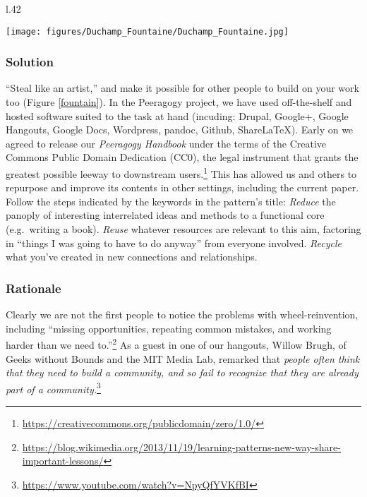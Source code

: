 \begin{wrapfigure}{l}{.42\textwidth}
\vspace{-.6cm}
\begin{center}
\texttt{[image: figures/Duchamp\_Fountaine/Duchamp\_Fountaine.jpg]}
\end{center}
\caption{A paradigmatic example of found-art. Caption reads: ``Fountain by R. Mutt, Photograph by Alfred Stieglitz, THE EXHIBIT REFUSED BY THE INDEPENDENTS''. Public domain, via the Wikimedia Commons.\label{fountain}}
\end{wrapfigure}


\subsubsection*{Solution} ``Steal like an artist,'' and make it possible for other people to build on your work too (Figure \ref{fountain}).  In the Peeragogy project, we have used off-the-shelf and hosted software suited to the task at hand (incuding: Drupal, Google+, Google Hangouts, Google Docs, Wordpress, pandoc, Github, ShareLaTeX).  Early on we agreed to release our \emph{Peeragogy Handbook} under the terms of the Creative Commons Public Domain Dedication (CC0), the legal instrument that grants the greatest possible leeway to downstream users.\footnote{\url{https://creativecommons.org/publicdomain/zero/1.0/}}  This has allowed us and others to repurpose and improve its contents in other settings, including the current paper.  Follow the steps indicated by the keywords in the pattern's title:  \emph{Reduce} the panoply of interesting interrelated ideas and methods to a functional core (e.g.~writing a book).  \emph{Reuse} whatever resources are relevant to this aim, factoring in ``things I was going to have to do anyway'' from everyone involved.  \emph{Recycle} what you've created in new connections and relationships.

\subsubsection*{Rationale} 
Clearly we are not the first people to notice the problems with wheel-reinvention, including ``missing opportunities, repeating common mistakes, and working harder than we need to.''\footnote{\url{https://blog.wikimedia.org/2013/11/19/learning-patterns-new-way-share-important-lessons/}}  As a guest in  one of our hangouts, Willow Brugh, of Geeks without Bounds and the MIT Media Lab, remarked that \emph{people often think that they need to build a community, and so fail to recognize that they are already part of a community.}\footnote{\url{https://www.youtube.com/watch?v=NpyQfYVKfBI}}

